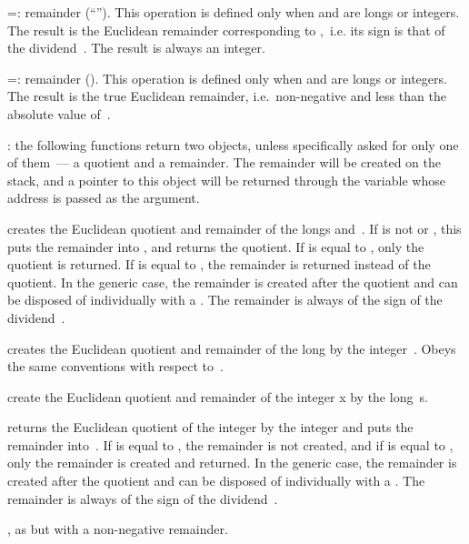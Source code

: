 \op=: remainder (``''). This operation is defined only
when  and  are longs or integers. The result is the Euclidean
remainder corresponding to ,~i.e. its sign is that of the
dividend~. The result is always an integer.

\op=: remainder (). This operation is defined only when
 and  are longs or integers. The result is the true Euclidean
remainder, i.e.~non-negative and less than the absolute value of~.

: the following functions return two objects,
unless specifically asked for only one of them~--- a quotient and a remainder.
The remainder will be created on the stack, and a  pointer to this
object will be returned through the variable whose address is passed as the
 argument.

 creates the Euclidean
quotient and remainder of the longs  and~. If  is not
 or , this puts the remainder into ,
and returns the quotient. If  is equal to , only the
quotient is returned. If  is equal to , the remainder
is returned instead of the quotient. In the generic case, the remainder is
created after the quotient and can be disposed of individually with a
. The remainder is always of the sign of the dividend~.

 creates the Euclidean
quotient and remainder of the long  by the integer~.
Obeys the same conventions with respect to~.

 create the Euclidean
quotient and remainder of the integer x by the long~s.

 returns the Euclidean quotient
of the integer  by the integer  and puts the remainder
into~. If  is equal to , the remainder is not
created, and if  is equal to  , only the remainder
is created and returned. In the generic case, the remainder is created
after the quotient and can be disposed of individually with a .
The remainder is always of the sign of the dividend~.

, as  but with a
non-negative remainder.


